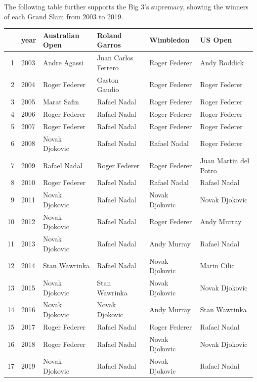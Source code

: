 \documentclass[11pt,preprint, authoryear]{elsarticle}
\let\origtable\table
\let\endorigtable\endtable
\renewenvironment{table}[1][2] {
    \expandafter\origtable\expandafter[H]
} {
    \endorigtable
}
\numberwithin{equation}{section}
\numberwithin{figure}{section}
\numberwithin{table}{section}
\begin{document}
The following table further supports the Big 3's supremacy, showing the
winners of each Grand Slam from 2003 to 2019.

\begin{table}[ht]
\centering
\begin{tabular}{rlllll}
  \hline
 & year & Australian Open & Roland Garros & Wimbledon & US Open \\ 
  \hline
1 & 2003 & Andre Agassi & Juan Carlos Ferrero & Roger Federer & Andy Roddick \\ 
  2 & 2004 & Roger Federer & Gaston Gaudio & Roger Federer & Roger Federer \\ 
  3 & 2005 & Marat Safin & Rafael Nadal & Roger Federer & Roger Federer \\ 
  4 & 2006 & Roger Federer & Rafael Nadal & Roger Federer & Roger Federer \\ 
  5 & 2007 & Roger Federer & Rafael Nadal & Roger Federer & Roger Federer \\ 
  6 & 2008 & Novak Djokovic & Rafael Nadal & Rafael Nadal & Roger Federer \\ 
  7 & 2009 & Rafael Nadal & Roger Federer & Roger Federer & Juan Martin del Potro \\ 
  8 & 2010 & Roger Federer & Rafael Nadal & Rafael Nadal & Rafael Nadal \\ 
  9 & 2011 & Novak Djokovic & Rafael Nadal & Novak Djokovic & Novak Djokovic \\ 
  10 & 2012 & Novak Djokovic & Rafael Nadal & Roger Federer & Andy Murray \\ 
  11 & 2013 & Novak Djokovic & Rafael Nadal & Andy Murray & Rafael Nadal \\ 
  12 & 2014 & Stan Wawrinka & Rafael Nadal & Novak Djokovic & Marin Cilic \\ 
  13 & 2015 & Novak Djokovic & Stan Wawrinka & Novak Djokovic & Novak Djokovic \\ 
  14 & 2016 & Novak Djokovic & Novak Djokovic & Andy Murray & Stan Wawrinka \\ 
  15 & 2017 & Roger Federer & Rafael Nadal & Roger Federer & Rafael Nadal \\ 
  16 & 2018 & Roger Federer & Rafael Nadal & Novak Djokovic & Novak Djokovic \\ 
  17 & 2019 & Novak Djokovic & Rafael Nadal & Novak Djokovic & Rafael Nadal \\ 
   \hline
\end{tabular}
\caption{Grand Slam Winners Since 2003} 
\end{table}
\end{document}
